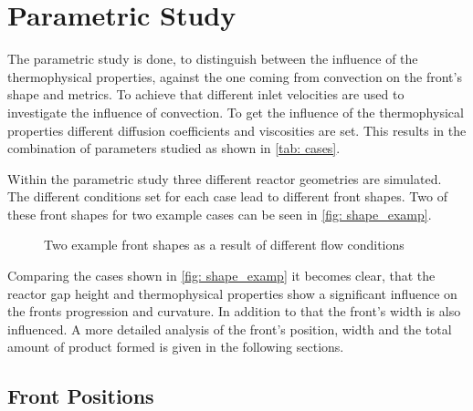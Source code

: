 \documentclass[../thesis.tex]{subfiles}
\begin{document}
\chapter{Parametric Study}
\label{chp: para_stud}
The parametric study is done, to distinguish between the influence of the thermophysical properties, against the one coming from convection on the front's shape and metrics. To achieve that different inlet velocities are used to investigate the influence of convection. To get the influence of the thermophysical properties different diffusion coefficients and viscosities are set. This results in the combination of parameters studied as shown in \autoref{tab: cases}.

Within the parametric study three different reactor geometries are simulated. The different conditions set for each case lead to different front shapes. Two of these front shapes for two example cases can be seen in \autoref{fig: shape_examp}.
\begin{figure}[htb]
	\centering
	\qquad
	\caption{Two example front shapes as a result of different flow conditions}%
	\label{fig: shape_examp}%
\end{figure}
Comparing the cases shown in \autoref{fig: shape_examp} it becomes clear, that the reactor gap height and thermophysical properties show a significant influence on the fronts progression and curvature. In addition to that the front's width is also influenced. A more detailed analysis of the front's position, width and the total amount of product formed is given in the following sections. 

\section{Front Positions}
\end{document}
